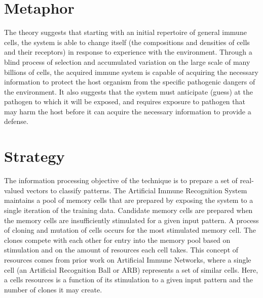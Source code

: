 \documentclass[a4paper, 11pt]{article}
\begin{document}
\section{Metaphor}
\label{sec:metaphor}
The theory suggests that starting with an initial repertoire of general immune cells, the system is able to change itself (the compositions and densities of cells and their receptors) in response to experience with the environment. Through a blind process of selection and accumulated variation on the large scale of many billions of cells, the acquired immune system is capable of acquiring the necessary information to protect the host organism from the specific pathogenic dangers of the environment. It also suggests that the system must anticipate (guess) at the pathogen to which it will be exposed, and requires exposure to pathogen that may harm the host before it can acquire the necessary information to provide a defense.

\section{Strategy}
\label{sec:strategy}
The information processing objective of the technique is to prepare a set of real-valued vectors to classify patterns. 
The Artificial Immune Recognition System maintains a pool of memory cells that are prepared by exposing the system to a single iteration of the training data. Candidate memory cells are prepared when the memory cells are insufficiently stimulated for a given input pattern. A process of cloning and mutation of cells occurs for the most stimulated memory cell. The clones compete with each other for entry into the memory pool based on stimulation and on the amount of resources each cell takes. This concept of resources comes from prior work on Artificial Immune Networks, where a single cell (an Artificial Recognition Ball or ARB) represents a set of similar cells. Here, a cells resources is a function of its stimulation to a given input pattern and the number of clones it may create.
\end{document}
